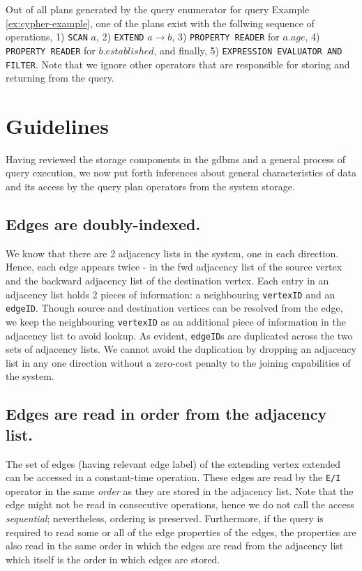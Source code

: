 Out of all plans generated by the query enumerator for query Example \ref{ex:cypher-example}, one of the plans exist with the follwing sequence of operations, 1) \texttt{SCAN} $a$, 2) \texttt{EXTEND} $a{\rightarrow}b$, 3) \texttt{PROPERTY READER} for $a.age$, 4) \texttt{PROPERTY READER} for $b.established$, and finally, 5) \texttt{EXPRESSION EVALUATOR AND FILTER}. Note that we ignore other operators that are responsible for storing and returning from the query.

\section{Guidelines}
\label{sec:guidelines}

Having reviewed the storage components in the \gls{gdbms} and a general process of query execution, we now put forth inferences about general characteristics of data and its access by the query plan operators from the system storage.

\subsection{Edges are doubly-indexed.}

We know that there are 2 adjacency lists in the system, one in each direction. Hence, each edge appears twice - in the \gls{fwd} adjacency list of the source vertex and the backward adjacency list of the destination vertex. Each entry in an adjacency list holds 2 pieces of information: a neighbouring \texttt{vertexID} and an \texttt{edgeID}. Though source and destination vertices can be resolved from the edge, we keep the neighbouring \texttt{vertexID} as an additional piece of information in the adjacency list to avoid lookup. As evident, \texttt{edgeID}s are duplicated across the two sets of adjacency lists. We cannot avoid the duplication by dropping an adjacency list in any one direction without a zero-cost penalty to the joining capabilities of the system.

\subsection{Edges are read in order from the adjacency list.}
\label{ssec:edges-ordered}

The set of edges (having relevant edge label) of the extending vertex extended can be accessed in a constant-time operation. These edges are read by the \texttt{E/I} operator in the same \emph{order} as they are stored in the adjacency list. Note that the edge might not be read in consecutive operations, hence we do not call the access \emph{sequential}; nevertheless, ordering is preserved. Furthermore, if the query is required to read some or all of the edge properties of the edges, the properties are also read in the same order in which the edges are read from the adjacency list which itself is the order in which edges are stored.


